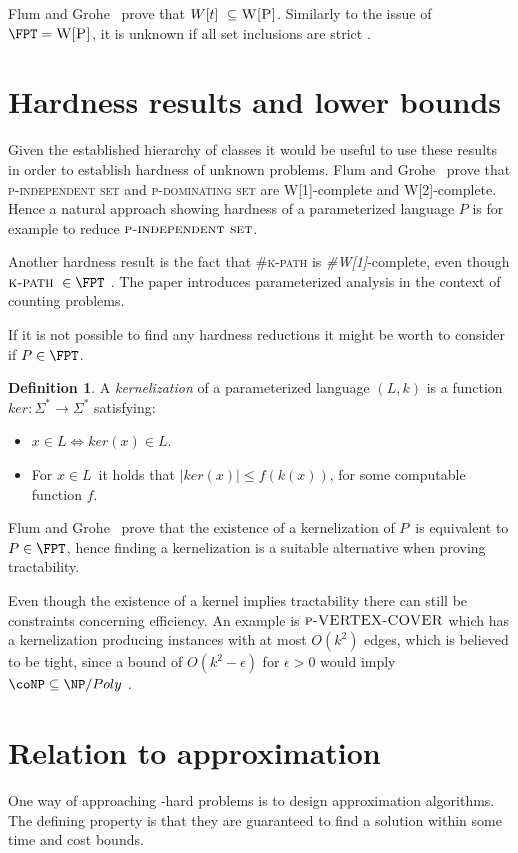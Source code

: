 \documentclass[a4paper,11pt]{report}
\theoremstyle{plain}
\theoremstyle{definition}
\newtheorem{defn}[thm]{Definition} %
\begin{document}
Flum and Grohe~\cite{FG06} prove that $W[t] \subseteq \textsc{W[P]}$.
Similarly to the issue of $\FPT = \textsc{W[P]}$, it is unknown if all set inclusions are strict \cite{FG06}.

\section{Hardness results and lower bounds}
Given the established hierarchy of classes it would be useful to use these results in order to establish hardness of unknown problems.
Flum and Grohe~\cite{FG06} prove that \textsc{p-independent set} and \textsc{p-dominating set} are \textsc{W[1]}-complete and \textsc{W[2]}-complete.
Hence a natural approach showing hardness of a parameterized language $P$ is for example to reduce $\textsc{p-independent set}$.

Another hardness result is the fact that \textsc{\#k-path} is \emph{\#W[1]}-complete, even though $\textsc{k-path} \in \FPT$ \cite{FG04}.
The paper introduces parameterized analysis in the context of counting problems.

If it is not possible to find any hardness reductions it might be worth to consider if $P \in \FPT$.

\begin{defn}
A \emph{kernelization} of a parameterized language $(L, k)$ is a function $ker : \Sigma^* \rightarrow \Sigma^*$ satisfying:
\begin{itemize}
\item $x \in L \Leftrightarrow ker(x) \in L$.
\item For $x \in L$ it holds that $|ker(x)| \leq f(k(x))$, for some computable function $f$.
\end{itemize}
\end{defn}

Flum and Grohe~\cite{FG06} prove that the existence of a kernelization of $P$ is equivalent to $P \in \FPT$, hence finding a kernelization is a suitable alternative when proving tractability.

Even though the existence of a kernel implies tractability there can still be constraints concerning efficiency.
An example is $\textsc{p-VERTEX-COVER}$ which has a kernelization producing instances with at most $O(k^2)$ edges, which is believed to be tight, since a bound of $O(k^2 - \epsilon)$ for $\epsilon > 0$
would imply $\coNP \subseteq \NP /Poly$ \cite{DELL10}.

\section{Relation to approximation}
\label{sec:approx}
One way of approaching \NP-hard problems is to design approximation algorithms.
The defining property is that they are guaranteed to find a solution within some time and cost bounds.
\end{document}
